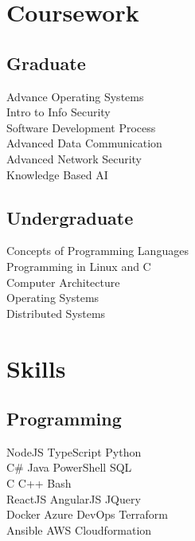 \documentclass[]{deedy-resume-openfont}
\begin{document}
\begin{minipage}[t]{0.33\textwidth}

\section{Coursework}
\subsection{Graduate}
Advance Operating Systems \\
Intro to Info Security \\
Software Development Process \\
Advanced Data Communication \\
Advanced Network Security \\
Knowledge Based AI
\sectionsep
\subsection{Undergraduate}
Concepts of Programming Languages \\
Programming in Linux and C \\
Computer Architecture \\
Operating Systems \\
Distributed Systems
\sectionsep


\section{Skills}
\subsection{Programming}

NodeJS \textbullet{} TypeScript \textbullet{}  Python \\
C\# \textbullet{} Java \textbullet{} PowerShell \textbullet{} SQL \\

C \textbullet{} C++ \textbullet{} Bash   \\
ReactJS \textbullet{} AngularJS \textbullet{} JQuery \\

Docker \textbullet{} Azure DevOps \textbullet{} Terraform \\
Ansible \textbullet{} AWS Cloudformation \\


\end{minipage}
\end{document}
